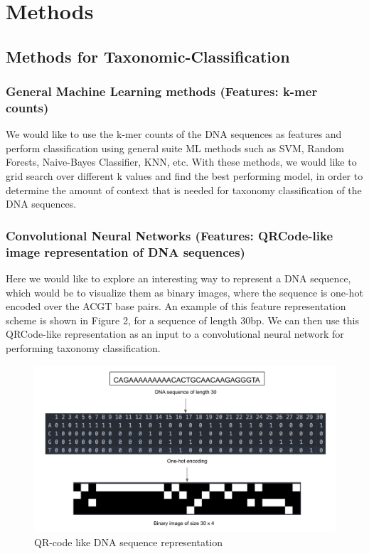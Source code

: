 \documentclass[12pt]{article}
\begin{document}
\section{Methods}
    \subsection{Methods for Taxonomic-Classification}
        \subsubsection{General Machine Learning methods (Features: k-mer counts)}
        We would like to use the k-mer counts of the DNA sequences as features and perform classification using general suite ML methods such as SVM, Random Forests, Naive-Bayes Classifier, KNN, etc. With these methods, we would like to grid search over different k values and find the best performing model, in order to determine the amount of context that is needed for taxonomy classification of the DNA sequences.
        \subsubsection{Convolutional Neural Networks (Features: QRCode-like image representation of DNA sequences)}
        Here we would like to explore an interesting way to represent a DNA sequence, which would be to visualize them as binary images, where the sequence is one-hot encoded over the ACGT base pairs. An example of this feature representation scheme is shown in Figure 2, for a sequence of length 30bp. We can then use this QRCode-like representation as an input to a convolutional neural network for performing taxonomy classification.

        \begin{figure}
        \centering
        \includegraphics[scale=0.25]{qrcode.png}
        \caption{QR-code like DNA sequence representation}
        \end{figure}
\end{document}
